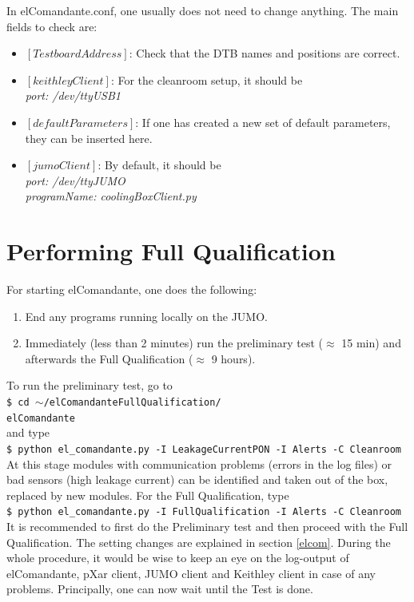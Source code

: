 \documentclass[fleqn,10pt]{SelfArx} %
\newcommand{\shellcmd}[1]{\\\indent\indent\texttt{\footnotesize\$ #1}\\}
\begin{document}
In elComandante.conf, one usually does not need to change anything. The main fields to check are:
\begin{itemize}
\item $[TestboardAddress]$: Check that the DTB names and positions are correct.
\item $[keithleyClient]$: For the cleanroom setup, it should be\\
{\it port: /dev/ttyUSB1}
\item $[defaultParameters]$: If one has created a new set of default parameters, they can be inserted here.
\item $[jumoClient]$: By default, it should be\\
{\it port: /dev/ttyJUMO\\programName: coolingBoxClient.py}
\end{itemize}

\section{Performing Full Qualification}
For starting elComandante, one does the following:
\begin{enumerate}
\item End any programs running locally on the JUMO. 
\item Immediately (less than 2 minutes) run the preliminary test ($\approx$ 15 min) and afterwards the Full Qualification ($\approx$ 9 hours).
\end{enumerate}
To run the preliminary test, go to 
\shellcmd{cd $\sim$/elComandanteFullQualification/ \\ elComandante}
and type
\shellcmd{python el\_comandante.py -I LeakageCurrentPON -I Alerts -C Cleanroom}
At this stage modules with communication problems (errors in the log files) or bad sensors (high leakage current) can be identified and taken out of the box, replaced by new modules.
For the Full Qualification, type
\shellcmd{python el\_comandante.py -I FullQualification -I Alerts -C Cleanroom}


It is recommended to first do the Preliminary test and then proceed with the Full Qualification. The setting changes are explained in section \ref{elcom}. During the whole procedure, it would be wise to keep an eye on the log-output of elComandante, pXar client, JUMO client and Keithley client in case of any problems. Principally, one can now wait until the Test is done. 
\end{document}
